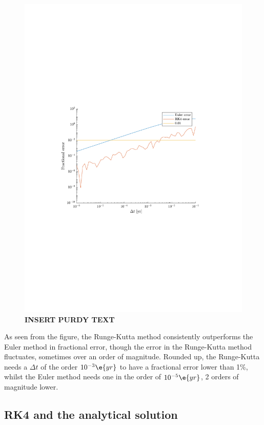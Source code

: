 \documentclass[a4paper,10pt]{article} 	%
\numberwithin{equation}{section}
\begin{document}
	\begin{figure}[H]
		\centering
		\includegraphics[width=0.7\linewidth]{KeplerdtErr.pdf}
		\caption{\textbf{INSERT PURDY TEXT}}
		\label{fig:KeplerdtErr}
	\end{figure}
	As seen from the figure, the Runge-Kutta method consistently outperforms the Euler method in fractional error, though the error in the Runge-Kutta method fluctuates, sometimes over an order of magnitude. Rounded up, the Runge-Kutta needs a $ \Delta t $ of the order $ 10^{-3} \e{yr} $ to have a fractional error lower than 1\%, whilst the Euler method needs one in the order of $ 10^{-5} \e{yr} $, 2 orders of magnitude lower.
	
	\subsection{RK4 and the analytical solution}
	
	
\end{document}
